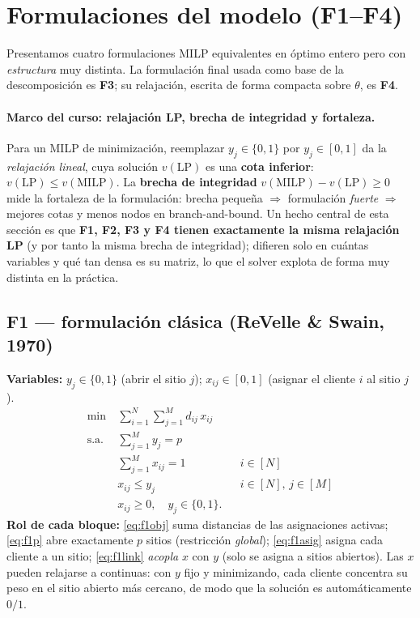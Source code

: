 \section{Formulaciones del modelo (F1--F4)}
\label{sec:formulaciones}

Presentamos cuatro formulaciones MILP equivalentes en óptimo entero pero con \emph{estructura}
muy distinta. La formulación final usada como base de la descomposición es \textbf{F3}; su
relajación, escrita de forma compacta sobre $\theta$, es \textbf{F4}.

\paragraph{Marco del curso: relajación LP, brecha de integridad y fortaleza.} Para un MILP de
minimización, reemplazar $y_j\in\{0,1\}$ por $y_j\in[0,1]$ da la \emph{relajación lineal}, cuya
solución $v(\text{LP})$ es una \textbf{cota inferior}: $v(\text{LP})\le v(\text{MILP})$. La
\textbf{brecha de integridad} $v(\text{MILP})-v(\text{LP})\ge0$ mide la fortaleza de la
formulación: brecha pequeña $\Rightarrow$ formulación \emph{fuerte} $\Rightarrow$ mejores cotas y
menos nodos en branch-and-bound. Un hecho central de esta sección es que \textbf{F1, F2, F3 y F4
tienen exactamente la misma relajación LP} (y por tanto la misma brecha de integridad); difieren
solo en cuántas variables y qué tan densa es su matriz, lo que el solver explota de forma muy
distinta en la práctica.

\subsection{F1 — formulación clásica (ReVelle \& Swain, 1970)}
\textbf{Variables:} $y_j\in\{0,1\}$ (abrir el sitio $j$); $x_{ij}\in[0,1]$ (asignar el cliente
$i$ al sitio $j$).
\begin{align}
  \min\ & \sum_{i=1}^{N}\sum_{j=1}^{M} d_{ij}\,x_{ij} \label{eq:f1obj}\\
  \text{s.a.}\ & \sum_{j=1}^{M} y_j = p \label{eq:f1p}\\
  & \sum_{j=1}^{M} x_{ij}=1 && i\in[N] \label{eq:f1asig}\\
  & x_{ij}\le y_j && i\in[N],\,j\in[M] \label{eq:f1link}\\
  & x_{ij}\ge 0,\quad y_j\in\{0,1\}. \nonumber
\end{align}
\textbf{Rol de cada bloque:} \eqref{eq:f1obj} suma distancias de las asignaciones activas;
\eqref{eq:f1p} abre exactamente $p$ sitios (restricción \emph{global}); \eqref{eq:f1asig} asigna
cada cliente a un sitio; \eqref{eq:f1link} \emph{acopla} $x$ con $y$ (solo se asigna a sitios
abiertos). Las $x$ pueden relajarse a continuas: con $y$ fijo y minimizando, cada cliente
concentra su peso en el sitio abierto más cercano, de modo que la solución es automáticamente
$0/1$.

